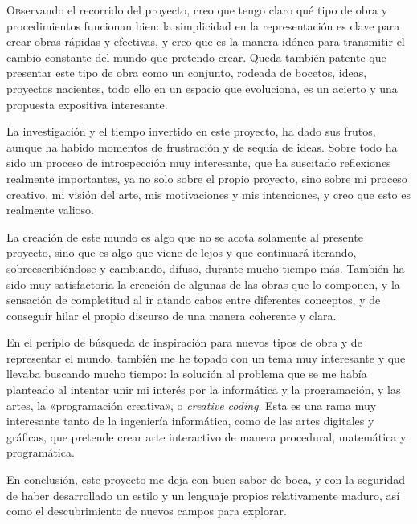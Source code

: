 \documentclass[twoside]{article}
\begin{document}
\begin{multicols}{2}

  \lettrine[nindent=0em,lines=3]{O}bservando el recorrido del proyecto, creo que tengo claro qué tipo de
  obra y procedimientos funcionan bien: la simplicidad en la
  representación es clave para crear obras rápidas y efectivas, y creo que
  es la manera idónea para transmitir el cambio constante del mundo que
  pretendo crear. Queda también patente que presentar este tipo de obra
  como un conjunto, rodeada de bocetos, ideas, proyectos nacientes, todo
  ello en un espacio que evoluciona, es un acierto y una propuesta
  expositiva interesante.

  La investigación y el tiempo invertido en este proyecto, ha dado sus
  frutos, aunque ha habido momentos de frustración y de sequía de ideas.
  Sobre todo ha sido un proceso de introspección muy interesante, que ha
  suscitado reflexiones realmente importantes, ya no solo sobre el propio
  proyecto, sino sobre mi proceso creativo, mi visión del arte, mis
  motivaciones y mis intenciones, y creo que esto es realmente valioso.

  La creación de este mundo es algo que no se acota solamente al presente
  proyecto, sino que es algo que viene de lejos y que continuará iterando,
  sobreescribiéndose y cambiando, difuso, durante mucho tiempo más.
  También ha sido muy satisfactoria la creación de algunas de las obras
  que lo componen, y la sensación de completitud al ir atando cabos entre
  diferentes conceptos, y de conseguir hilar el propio discurso de una
  manera coherente y clara.

  En el periplo de búsqueda de inspiración para nuevos tipos de obra y de
  representar el mundo, también me he topado con un tema muy interesante y
  que llevaba buscando mucho tiempo: la solución al problema que se me
  había planteado al intentar unir mi interés por la informática y la
  programación, y las artes, la «programación creativa», o \emph{creative
    coding}. Esta es una rama muy interesante tanto de la ingeniería
  informática, como de las artes digitales y gráficas, que pretende crear
  arte interactivo de manera procedural, matemática y programática.

  En conclusión, este proyecto me deja con buen sabor de boca, y con la
  seguridad de haber desarrollado un estilo y un lenguaje propios
  relativamente maduro, así como el descubrimiento de nuevos campos para
  explorar.
\end{multicols}
\newpage
\end{document}
